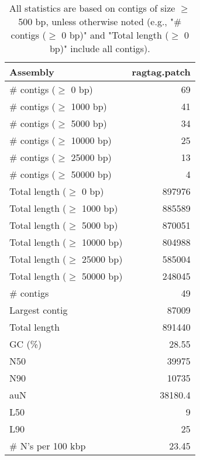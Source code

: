 \documentclass[12pt,a4paper]{article}
\begin{document}
\begin{table}[ht]
\begin{center}
\caption{All statistics are based on contigs of size $\geq$ 500 bp, unless otherwise noted (e.g., "\# contigs ($\geq$ 0 bp)" and "Total length ($\geq$ 0 bp)" include all contigs).}
\begin{tabular}{|l*{1}{|r}|}
\hline
Assembly & ragtag.patch \\ \hline
\# contigs ($\geq$ 0 bp) & 69 \\ \hline
\# contigs ($\geq$ 1000 bp) & 41 \\ \hline
\# contigs ($\geq$ 5000 bp) & 34 \\ \hline
\# contigs ($\geq$ 10000 bp) & 25 \\ \hline
\# contigs ($\geq$ 25000 bp) & 13 \\ \hline
\# contigs ($\geq$ 50000 bp) & 4 \\ \hline
Total length ($\geq$ 0 bp) & 897976 \\ \hline
Total length ($\geq$ 1000 bp) & 885589 \\ \hline
Total length ($\geq$ 5000 bp) & 870051 \\ \hline
Total length ($\geq$ 10000 bp) & 804988 \\ \hline
Total length ($\geq$ 25000 bp) & 585004 \\ \hline
Total length ($\geq$ 50000 bp) & 248045 \\ \hline
\# contigs & 49 \\ \hline
Largest contig & 87009 \\ \hline
Total length & 891440 \\ \hline
GC (\%) & 28.55 \\ \hline
N50 & 39975 \\ \hline
N90 & 10735 \\ \hline
auN & 38180.4 \\ \hline
L50 & 9 \\ \hline
L90 & 25 \\ \hline
\# N's per 100 kbp & 23.45 \\ \hline
\end{tabular}
\end{center}
\end{table}
\end{document}
